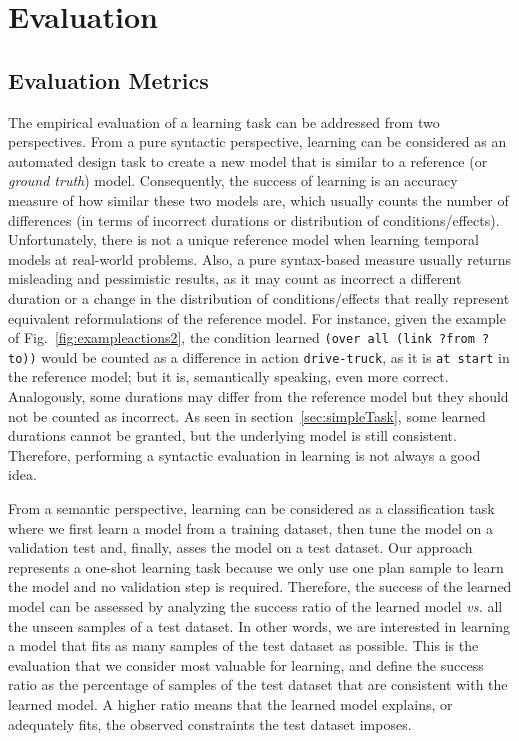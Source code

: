 \documentclass{ecai}
\begin{document}
\section{Evaluation}
\label{sec:evaluation}

\subsection{Evaluation Metrics}


The empirical evaluation of a learning task can be addressed from two perspectives. From a pure syntactic perspective, learning can be considered as an automated design task to create a new model that is similar to a reference (or {\em ground truth}) model. Consequently, the success of learning is an accuracy measure of how similar these two models are, which usually counts the number of differences (in terms of incorrect durations or distribution of conditions/effects).
Unfortunately, there is not a unique reference model when learning temporal models at real-world problems.
Also, a pure syntax-based measure usually returns misleading and pessimistic results, as it may count as incorrect a different duration or a change in the distribution of conditions/effects that really represent equivalent reformulations of the reference model. For instance, given the example of Fig.~\ref{fig:exampleactions2}, the condition learned \texttt{(over all (link ?from ?to))} would be counted as a difference in action \texttt{drive-truck}, as it is \texttt{at start} in the reference model; but it is, semantically speaking, even more correct. Analogously, some durations may differ from the reference model but they should not be counted as incorrect. As seen in section~\ref{sec:simpleTask}, some learned durations cannot be granted, but the underlying model is still consistent. Therefore, performing a syntactic evaluation in learning is not always a good idea.


From a semantic perspective, learning can be considered as a classification task where we first learn a model from a training dataset, then tune the model on a validation test and, finally, asses the model on a test dataset. Our approach represents a one-shot learning task because we only use one plan sample to learn the model and no validation step is required.
Therefore, the success of the learned model can be assessed by analyzing the success ratio of the learned model \emph{vs.} all the unseen samples of a test dataset. In other words, we are interested in learning a model that fits as many samples of the test dataset as possible. This is the evaluation that we consider most valuable for learning, and define the success ratio as the percentage of samples of the test dataset that are consistent with the learned model. A higher ratio means that the learned model explains, or adequately fits, the observed constraints the test dataset imposes.
\end{document}
